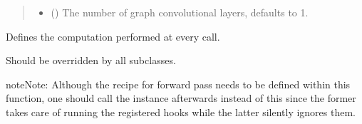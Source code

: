 \documentclass[a4paper,10pt,english]{report}
\begin{document}
\begin{fulllineitems}
\begin{quote}
\begin{description}
\begin{itemize}
\item {} 
\sphinxAtStartPar
{} (\sphinxstyleliteralemphasis{\sphinxupquote{, }}) \textendash{} The number of graph convolutional layers, defaults to 1.

\end{itemize}

\end{description}\end{quote}

\begin{fulllineitems}
\label{\detokenize{NNucleate:NNucleate.models.GNNCV.forward}}
\pysigstartsignatures
{}
\pysigstopsignatures
\sphinxAtStartPar
Defines the computation performed at every call.

\sphinxAtStartPar
Should be overridden by all subclasses.

\begin{sphinxadmonition}{note}{Note:}
\sphinxAtStartPar
Although the recipe for forward pass needs to be defined within
this function, one should call the  instance afterwards
instead of this since the former takes care of running the
registered hooks while the latter silently ignores them.
\end{sphinxadmonition}

\end{fulllineitems}


\begin{fulllineitems}
\label{\detokenize{NNucleate:NNucleate.models.GNNCV.training}}
\pysigstartsignatures
{}
\pysigstopsignatures
\end{fulllineitems}


\end{fulllineitems}

\end{document}
